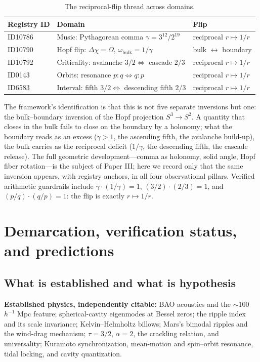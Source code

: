 \documentclass[11pt]{article}
\theoremstyle{remark}
\begin{document}
\begin{table}[ht]
\centering
\caption{The reciprocal-flip thread across domains.}
\label{tab:flip}
\begin{tabular}{lll}
\toprule
Registry ID & Domain & Flip \\
\midrule
ID10786 & Music: Pythagorean comma $\gamma = 3^{12}/2^{19}$ & reciprocal $r \mapsto 1/r$ \\
ID10790 & Hopf flip: $\Delta\chi = \Omega$, $\omega_{\mathrm{bulk}} = 1/\gamma$ & bulk $\leftrightarrow$ boundary \\
ID10792 & Criticality: avalanche $3/2 \Leftrightarrow$ cascade $2/3$ & reciprocal $r \mapsto 1/r$ \\
ID0143 & Orbits: resonance $p{:}q \Leftrightarrow q{:}p$ & reciprocal $r \mapsto 1/r$ \\
ID6583 & Interval: fifth $3/2 \Leftrightarrow$ descending fifth $2/3$ & reciprocal $r \mapsto 1/r$ \\
\bottomrule
\end{tabular}
\end{table}

The framework's identification is that this is not five separate inversions but one: the bulk--boundary inversion of the Hopf projection $S^3 \to S^2$. A quantity that closes in the bulk fails to close on the boundary by a holonomy; what the boundary reads as an excess ($\gamma > 1$, the ascending fifth, the avalanche build-up), the bulk carries as the reciprocal deficit ($1/\gamma$, the descending fifth, the cascade release). The full geometric development---comma as holonomy, solid angle, Hopf fiber rotation---is the subject of Paper III; here we record only that the same inversion appears, with registry anchors, in all four observational pillars. Verified arithmetic guardrails include $\gamma \cdot (1/\gamma) = 1$, $(3/2)\cdot(2/3) = 1$, and $(p/q)\cdot(q/p) = 1$: the flip is exactly $r \mapsto 1/r$.

\section{Demarcation, verification status, and predictions}
\label{sec:demarcation}

\subsection{What is established and what is hypothesis}

\textbf{Established physics, independently citable:} BAO acoustics and the $\sim$100 $h^{-1}$ Mpc feature; spherical-cavity eigenmodes at Bessel zeros; the ripple index and its scale invariance; Kelvin--Helmholtz billows; Mars's bimodal ripples and the wind-drag mechanism; $\tau = 3/2$, $\alpha = 2$, the crackling relation, and universality; Kuramoto synchronization, mean-motion and spin--orbit resonance, tidal locking, and cavity quantization.
\end{document}

